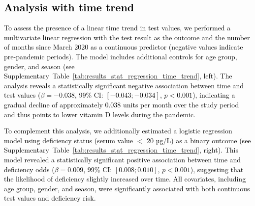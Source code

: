 \documentclass[12pt]{article}
\renewcommand{\arraystretch}{1.2}
\newcommand{\REV}[1]{\textcolor{black}{#1}}
\begin{document}
\begin{appendices}
\newpage
\section{\REV{Analysis with time trend}}
\label{supp:analysis_with_time_trend}


\REV{To assess the presence of a linear time trend in test values, we performed a multivariate linear regression with the test result as the outcome and the number of months since March 2020 as a continuous predictor (negative values indicate pre-pandemic periods). The model includes additional controls for age group, gender, and season (see Supplementary~Table~\ref{tab:results_stat_regression_time_trend}, left). The analysis reveals a statistically significant negative association between time and test values ($\beta = -0.038$, 99\% CI: $[-0.043; -0.034]$, $p < 0.001$), indicating a gradual decline of approximately 0.038 units per month over the study period and thus points to lower vitamin D levels during the pandemic. }

\REV{To complement this analysis, we additionally estimated a logistic regression model using deficiency status (serum value $<$ 20 µg/L) as a binary outcome (see Supplementary~Table~\ref{tab:results_stat_regression_time_trend}, right). This model revealed a statistically significant positive association between time and deficiency odds ($\beta = 0.009$, 99\% CI: $[0.008; 0.010]$, $p < 0.001$), suggesting that the likelihood of deficiency slightly increased over time. All covariates, including age group, gender, and season, were significantly associated with both continuous test values and deficiency risk.}

\begin{table}[h]
\centering
{}
\caption[Linear and logistic regression with time trend]{\REV{\textbf{Regression analysis with time trend.} Estimated coefficients from linear and logistic regression analysis modeling the effect of time and covariates on test value and deficiency. The linear model uses the continuous test value as the dependent variable; the logistic model uses deficiency as the binary dependent variable. Coefficients are shown with 99\% confidence intervals (CIs). The $p$-values are derived from $t$-tests (linear model) and Wald $z$-tests (logistic model) for each coefficient.}}
\label{tab:results_stat_regression_time_trend}
\scriptsize                    %
\setlength{\tabcolsep}{4pt}    %
\renewcommand{\arraystretch}{1.05}


\end{table}
\end{appendices}
\end{document}
